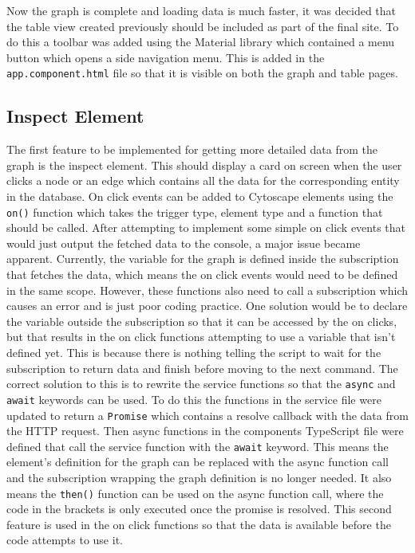 Now the graph is complete and loading data is much faster, it was decided that the table view created previously should be included as part of the final site. 
To do this a toolbar was added using the Material library which contained a menu button which opens a side navigation menu. This is added in the \verb|app.component.html| file so that it 
is visible on both the graph and table pages.
\subsection{Inspect Element}
The first feature to be implemented for getting more detailed data from the graph is the inspect element. This should display 
a card on screen when the user clicks a node or an edge which contains all the data for the corresponding entity in the database. 
On click events can be added to Cytoscape elements using the \verb|on()| function which takes the trigger type, element type and a function that should be called. 
After attempting to implement some simple on click events that would just output the fetched data to the console, a major issue became apparent.
Currently, the variable for the graph is defined inside the subscription that fetches the data, which means the on click events would need to be 
defined in the same scope. However, these functions also need to call a subscription which causes an error and is just poor coding practice. One solution 
would be to declare the variable outside the subscription so that it can be accessed by the on clicks, but that results in the on click 
functions attempting to use a variable that isn't defined yet. This is because there is nothing telling the script to wait for the 
subscription to return data and finish before moving to the next command. The correct solution to this is to rewrite the service functions so that 
the \verb|async| and \verb|await| keywords can be used. To do this the functions in the service file were updated to return a \verb|Promise| which contains a resolve 
callback with the data from the HTTP request. Then async functions in the components TypeScript file were defined that call the service function 
with the \verb|await| keyword. This means the element's definition for the graph can be replaced with the async function call 
and the subscription wrapping the graph definition is no longer needed. It also means the \verb|then()| function can be used on the async function call, 
where the code in the brackets is only executed once the promise is resolved. This second feature is used in the on click functions so that the data is available 
before the code attempts to use it.

